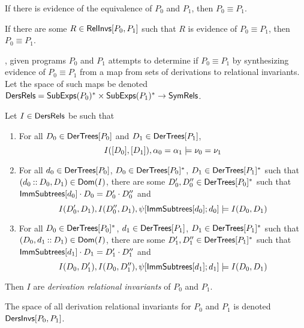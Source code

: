 \begin{ex}
  \label{ex:rel-invs}
\end{ex}

If there is evidence of the equivalence of $P_0$ and $P_1$, then $P_0
\equiv P_1$.
%
\begin{lemma}
  \label{lemma:equiv-evidence}
  If there are some $R \in \mathsf{RelInvs}[ P_0, P_1 ]$ such that $R$ is
  evidence of $P_0 \equiv P_1$, then $P_0 \equiv P_1$.
\end{lemma}

\sys, given programs $P_0$ and $P_1$ attempts to determine if $P_0
\equiv P_1$ by synthesizing evidence of $P_0 \equiv P_1$ from a map
from sets of derivations to relational invariants.
%
Let the space of such maps be denoted $\mathsf{DersRels} = \mathsf{SubExps}(P_0)^{*}
\times \mathsf{SubExps}(P_1)^{*} \to \mathsf{SymRels}$.
%
\begin{defn}
  \label{defn:der-rel-invs}
  Let $I \in \mathsf{DersRels}$ be such that %
  \begin{enumerate}
  \item 
    For all $D_0 \in \mathsf{DerTrees}[ P_0 ]$ and $D_1 \in \mathsf{DerTrees}[ P_1 ]$,
    \[ I([ D_0 ], [ D_1 ]), \alpha_0 = \alpha_1 \entails %
    \nu_0 = \nu_1 \]
  \item 
    For all $d_0 \in \mathsf{DerTrees}[ P_0 ]$, %
    $D_0 \in \mathsf{DerTrees}[ P_0 ]^{*}$, %
    $D_1 \in \mathsf{DerTrees}[ P_1 ]^{*}$ such that $(d_0 \mathbin{::} D_0, D_1) \in
    \mathsf{Dom}(I)$, %
    there are some $D_0', D_0'' \in \mathsf{DerTrees}[ P_0 ]^{*}$ such that
    $\mathsf{ImmSubtrees}[ d_0 ] \cdot D_0 = D_0' \cdot D_0''$ and %
    \[ I(D_0', D_1), I(D_0'', D_1), \psi[  \mathsf{ImmSubtrees}[  d_0  ]  ; 
      d_0  ] \models I(D_0, D_1) \]
  \item 
    For all $D_0 \in \mathsf{DerTrees}[ P_0 ]^{*}$, %
    $d_1 \in \mathsf{DerTrees}[ P_1 ]$, %
    $D_1 \in \mathsf{DerTrees}[ P_1 ]^{*}$ such that $(D_0, d_1 \mathbin{::} D_1) \in
    \mathsf{Dom}(I)$, %
    there are some $D_1', D_1'' \in \mathsf{DerTrees}[ P_1 ]^{*}$ such that
    $\mathsf{ImmSubtrees}[ d_1 ] \cdot D_1 = D_1' \cdot D_1''$ and %
    \[ I(D_0, D_1'), I(D_0, D_1''), \psi[  \mathsf{ImmSubtrees}[  d_1  ]  ; 
      d_1  ] \models I(D_0, D_1) \]
  \end{enumerate}
  Then $I$ are \emph{derivation relational invariants} of $P_0$ and
  $P_1$.
\end{defn}
%
The space of all derivation relational invariants for $P_0$ and $P_1$
is denoted $\mathsf{DersInvs}[ P_0, P_1 ]$.
%

